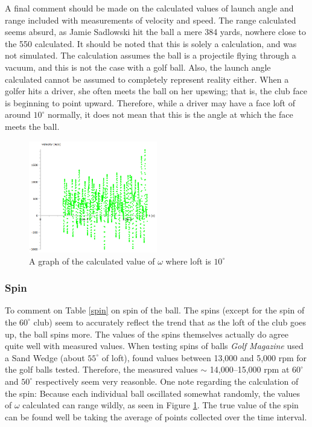 \documentclass{article}
\begin{document}
A final comment should be made on the calculated values of launch angle and range included with measurements of velocity and speed. The range calculated seems absurd, as Jamie Sadlowski hit the ball a mere 384 yards, nowhere close to the 550 calculated. It should be noted that this is solely a calculation, and was not simulated. The calculation assumes the ball is a projectile \mbox{f}lying through a vacuum, and this is not the case with a golf ball. Also, the launch angle calculated cannot be assumed to completely represent reality either. When a golfer hits a driver, she often meets the ball on her upswing; that is, the club face is beginning to point upward. Therefore, while a driver may have a face loft of around $10^{\circ}$ normally, it does not mean that this is the angle at which the face meets the ball.

\begin{figure}[h]
\centering
\includegraphics[width = 0.5\textwidth]{spin_10.png}
\caption{A graph of the calculated value of $\omega$ where loft is $10^{\circ}$}
\label{fig:spin10}
\end{figure}

\subsubsection{Spin}
To comment on Table \ref{spin} on spin of the ball. The spins (except for the spin of the $60^{\circ}$ club) seem to accurately re\mbox{f}lect the trend that as the loft of the club goes up, the ball spins more. The values of the spins themselves actually do agree quite well with measured values. When testing spins of balls \textit{Golf Magazine} used a Sand Wedge (about $55^{\circ}$ of loft), found values between 13,000 and 5,000 rpm for the golf balls tested. Therefore, the measured values $\sim$ 14,000--15,000 rpm at $60^{\circ}$ and $50^{\circ}$ respectively seem very reasonble. One note regarding the calculation of the spin: Because each individual ball oscillated somewhat randomly, the values of $\omega$ calculated can range wildly, as seen in Figure \ref{fig:spin10}. The true value of the spin can be found well be taking the average of points collected over the time interval.
\end{document}

